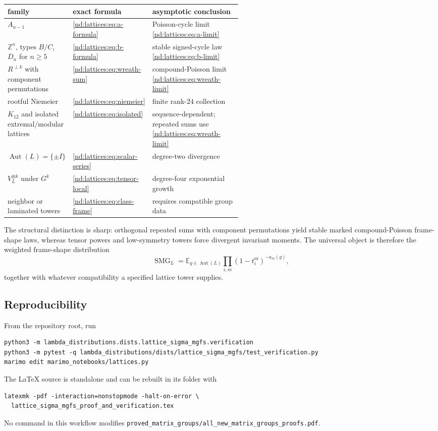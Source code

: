 \documentclass[10pt]{article}
\newcommand{\SMG}{\operatorname{SMG}}
\newcommand{\MGF}{\SMG}
\newcommand{\E}{\mathbb E}
\newcommand{\Z}{\mathbb Z}
\newcommand{\Aut}{\operatorname{Aut}}
\begin{document}
\begin{center}
\small
\begin{tabularx}{\linewidth}{@{}>{\raggedright\arraybackslash}p{0.25\linewidth}
>{\raggedright\arraybackslash}p{0.29\linewidth}X@{}}\toprule
family & exact formula & asymptotic conclusion\\\midrule
$A_{n-1}$ & \eqref{nd:lattices:eq:a-formula} & Poisson-cycle limit \eqref{nd:lattices:eq:a-limit}\\
$\Z^n$, types $B/C$, $D_n$ for $n\ge5$ & \eqref{nd:lattices:eq:b-formula} & stable signed-cycle law \eqref{nd:lattices:eq:b-limit}\\
$R^{\perp k}$ with component permutations & \eqref{nd:lattices:eq:wreath-sum} & compound-Poisson limit \eqref{nd:lattices:eq:wreath-limit}\\
rootful Niemeier & \eqref{nd:lattices:eq:niemeier} & finite rank-$24$ collection\\
$K_{12}$ and isolated extremal/modular lattices & \eqref{nd:lattices:eq:isolated} & sequence-dependent; repeated sums use \eqref{nd:lattices:eq:wreath-limit}\\
$\Aut(L)=\{\pm I\}$ & \eqref{nd:lattices:eq:scalar-series} & degree-two divergence\\
$V_L^{\otimes k}$ under $G^k$ & \eqref{nd:lattices:eq:tensor-local} & degree-four exponential growth\\
neighbor or laminated towers & \eqref{nd:lattices:eq:class-frame} & requires compatible group data\\\bottomrule
\end{tabularx}
\end{center}

The structural distinction is sharp: orthogonal repeated sums with component
permutations yield stable marked compound-Poisson frame-shape laws, whereas
tensor powers and low-symmetry towers force divergent invariant moments.
The universal object is therefore the weighted frame-shape distribution
\[
 \boxed{\MGF_L=\E_{g\in\Aut(L)}
 \prod_{i,m}(1-t_i^m)^{-a_m(g)},}
\]
together with whatever compatibility a specified lattice tower supplies.

\subsection{Reproducibility}

From the repository root, run
\begin{verbatim}
python3 -m lambda_distributions.dists.lattice_sigma_mgfs.verification
python3 -m pytest -q lambda_distributions/dists/lattice_sigma_mgfs/test_verification.py
marimo edit marimo_notebooks/lattices.py
\end{verbatim}
The LaTeX source is standalone and can be rebuilt in its folder with
\begin{verbatim}
latexmk -pdf -interaction=nonstopmode -halt-on-error \
  lattice_sigma_mgfs_proof_and_verification.tex
\end{verbatim}
No command in this workflow modifies
\texttt{proved\_matrix\_groups/all\_new\_matrix\_groups\_proofs.pdf}.
\end{document}
